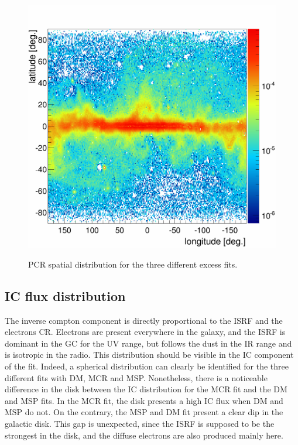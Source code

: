 \begin{figure}[h]
\begin{minipage}[h]{0.3\textwidth}
	  \label{}
  \end{minipage}
  \hfill
  \begin{minipage}[h]{0.3\textwidth}
	  \centering
	  \includegraphics[width=1.\linewidth]{pic/discussion/MSPonly_fine_PCR_integral_distribution.png}
	  \label{}
  \end{minipage}
  \caption{PCR spatial distribution for the three different excess fits.}
  \label{fig:PCR_flux_distrib_excess_comp}	 
\end{figure}



\subsection{IC flux distribution}
The inverse compton component is directly proportional to the ISRF and the electrons CR. Electrons are present everywhere in the galaxy, and the ISRF is dominant in the GC for the UV range, but follows the dust in the IR range and is isotropic in the radio. This distribution should be visible in the IC component of the fit.
Indeed, a spherical distribution can clearly be identified for the three different fits with DM, MCR and MSP. Nonetheless, there is a noticeable difference in the disk between the IC distribution for the MCR fit and the DM and MSP fits. In the MCR fit, the disk presents a high IC flux when DM and MSP do not. On the contrary, the MSP and DM fit present a clear dip in the galactic disk. This gap is unexpected, since the ISRF is supposed to be the strongest in the disk, and the diffuse electrons are also produced mainly here. 

